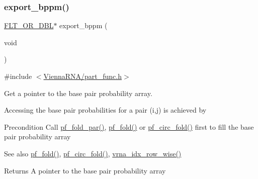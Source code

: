 \subsubsection{\texorpdfstring{export\_bppm()}{export\_bppm()}}
{\footnotesize\ttfamily \mbox{\hyperlink{group__data__structures_ga31125aeace516926bf7f251f759b6126}{F\+L\+T\+\_\+\+O\+R\+\_\+\+D\+BL}}$\ast$ export\+\_\+bppm (\begin{DoxyParamCaption}\item[{void}]{ }\end{DoxyParamCaption})}



{\ttfamily \#include $<$\mbox{\hyperlink{part__func_8h}{Vienna\+R\+N\+A/part\+\_\+func.\+h}}$>$}



Get a pointer to the base pair probability array. 

Accessing the base pair probabilities for a pair (i,j) is achieved by 
\begin{DoxyCode}{0}
\end{DoxyCode}


\begin{DoxyPrecond}{Precondition}
Call \mbox{\hyperlink{group__part__func__global__deprecated_gac4f95bee734b2563a3d6e9932117ebdf}{pf\+\_\+fold\+\_\+par()}}, \mbox{\hyperlink{group__part__func__global__deprecated_gadc3db3d98742427e7001a7fd36ef28c2}{pf\+\_\+fold()}} or \mbox{\hyperlink{group__part__func__global__deprecated_ga819ce5fca8984004ac81c4a3b04cb735}{pf\+\_\+circ\+\_\+fold()}} first to fill the base pair probability array
\end{DoxyPrecond}
\begin{DoxySeeAlso}{See also}
\mbox{\hyperlink{group__part__func__global__deprecated_gadc3db3d98742427e7001a7fd36ef28c2}{pf\+\_\+fold()}}, \mbox{\hyperlink{group__part__func__global__deprecated_ga819ce5fca8984004ac81c4a3b04cb735}{pf\+\_\+circ\+\_\+fold()}}, \mbox{\hyperlink{group__utils_ga70b180e9ea764218a82647a1cd347445}{vrna\+\_\+idx\+\_\+row\+\_\+wise()}}
\end{DoxySeeAlso}
\begin{DoxyReturn}{Returns}
A pointer to the base pair probability array 
\end{DoxyReturn}
\mbox{\label{group__part__func__global__deprecated_ga42faebdfce6f070c5f89adfc8427525c}} 
